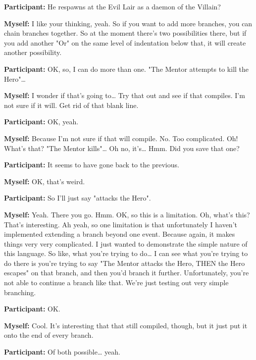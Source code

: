 \documentclass[11pt]{report}
\newcommand{\llabel}[1]{\hypertarget{llineno:#1}{\linelabel{#1}}}
\begin{document}
\begin{linenumbers}
\textbf{Participant:} He respawns at the Evil Lair as a daemon of the Villain?

\textbf{Myself:} I like your thinking, yeah. So if you want to add more branches, you can chain branches together. So at the moment there's two possibilities there, but if you add another "Or" on the same level of indentation below that, it will create another possibility.

\textbf{Participant:} OK, so, I can do more than one. "The Mentor attempts to kill the Hero"\ldots{}

\textbf{Myself:} I wonder if that's going to\ldots{} Try that out and see if that compiles. I'm not sure if it will. Get rid of that blank line.

\textbf{Participant:} OK, yeah.

\textbf{Myself:} Because I'm not sure if that will compile. No. Too complicated. Oh! What's that? "The Mentor kills"\ldots{} Oh no, it's\ldots{} Hmm. Did you save that one?

\textbf{Participant:} It seems to have gone back to the previous.

\textbf{Myself:} OK, that's weird.

\textbf{Participant:} So I'll just say "attacks the Hero".

\textbf{Myself:} Yeah. There you go. Hmm. OK, so this is a limitation. Oh,
what's this? That's interesting. Ah yeah, so one limitation is that
unfortunately I haven't implemented extending a branch beyond one event. Because
again, it makes things very very complicated. I just wanted to demonstrate the
simple nature of this language. So like, what you're trying to do\ldots{} I can
see what you're trying to do there is you're trying to say "The Mentor attacks
the Hero, THEN the Hero escapes" on that branch, and then you'd branch it
further. Unfortunately, you're not able to continue a branch like that. We're
just testing out very simple branching.\llabel{lne:bug2a}

\textbf{Participant:} OK.

\textbf{Myself:} Cool. It's interesting that that still compiled, though, but it just put it onto the end of every branch.

\textbf{Participant:} Of both possible\ldots{} yeah.


\end{linenumbers}
\end{document}
